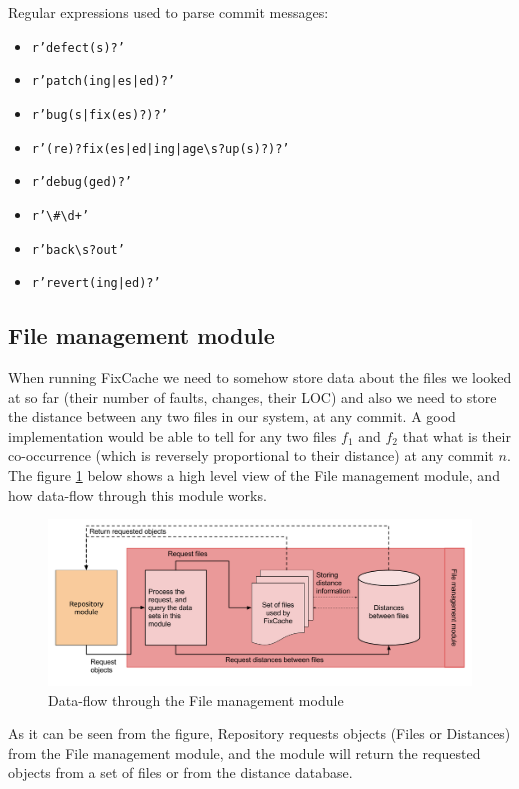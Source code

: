 \documentclass[12pt,twoside,notitlepage]{report}
\newcommand{\fxch}{FixCache}
\begin{document}
Regular expressions used to parse commit messages:
\begin{itemize}
\item \texttt{r'defect(s)?'}
\item \texttt{r'patch(ing|es|ed)?'}
\item \texttt{r'bug(s|fix(es)?)?'}
\item \texttt{r'(re)?fix(es|ed|ing|age\textbackslash s?up(s)?)?'}
\item \texttt{r'debug(ged)?'}
\item \texttt{r'\textbackslash\#\textbackslash d+'}
\item \texttt{r'back\textbackslash s?out'}
\item \texttt{r'revert(ing|ed)?'}
\end{itemize}
\subsection{File management module}
When running \fxch{}{} we need to somehow store data about the files we looked at so far (their number of faults, changes, their LOC) and also we need to store the distance between any two files in our system, at any commit. A  good implementation would be able to tell for any two files $f_1$ and $f_2$ that what is their co-occurrence (which is reversely proportional to their distance) at any commit $n$. The figure \ref{filemanagement_module} below shows a high level view of the File management module, and how data-flow through this module works.
\begin{figure}[h]
\includegraphics[width=1.0\textwidth]{filemanagement_module.png}
\caption{Data-flow through the File management module}
\label{filemanagement_module}
\end{figure}

As it can be seen from the figure, Repository requests objects (Files or Distances) from the File management module, and the module will return the requested objects from a set of files or from the distance database.
\end{document}

